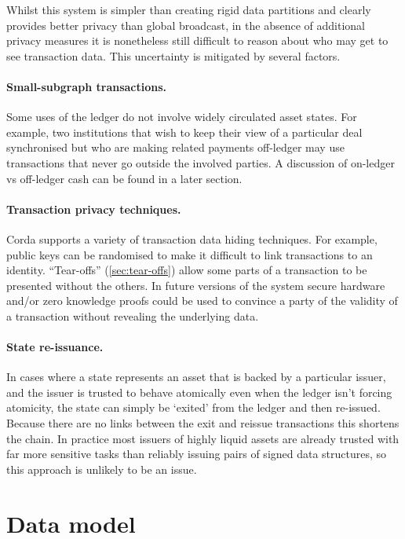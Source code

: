 \documentclass{article}
\begin{document}
Whilst this system is simpler than creating rigid data partitions and clearly provides better privacy than global
broadcast, in the absence of additional privacy measures it is nonetheless still difficult to reason about who may
get to see transaction data. This uncertainty is mitigated by several factors.

\paragraph{Small-subgraph transactions.}Some uses of the ledger do not involve widely circulated asset states. For
example, two institutions that wish to keep their view of a particular deal synchronised but who are making related
payments off-ledger may use transactions that never go outside the involved parties. A discussion of on-ledger vs
off-ledger cash can be found in a later section.

\paragraph{Transaction privacy techniques.}Corda supports a variety of transaction data hiding techniques. For
example, public keys can be randomised to make it difficult to link transactions to an identity. ``Tear-offs''
(\cref{sec:tear-offs}) allow some parts of a transaction to be presented without the others. In future versions of
the system secure hardware and/or zero knowledge proofs could be used to convince a party of the validity of a
transaction without revealing the underlying data.

\paragraph{State re-issuance.}In cases where a state represents an asset that is backed by a particular issuer, and
the issuer is trusted to behave atomically even when the ledger isn't forcing atomicity, the state can simply be
`exited' from the ledger and then re-issued. Because there are no links between the exit and reissue transactions
this shortens the chain. In practice most issuers of highly liquid assets are already trusted with far more
sensitive tasks than reliably issuing pairs of signed data structures, so this approach is unlikely to be an issue.

\section{Data model}
\end{document}
